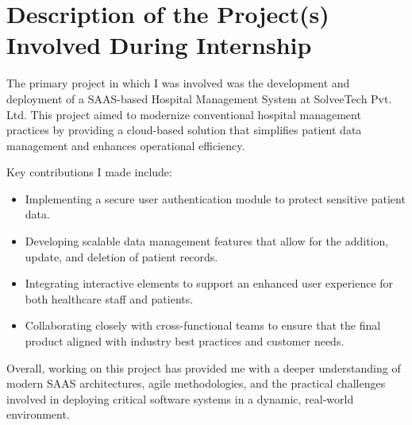 \section{Description of the Project(s) Involved During Internship}
The primary project in which I was involved was the development and deployment of a SAAS-based Hospital Management System at SolveeTech Pvt. Ltd. This project aimed to modernize conventional hospital management practices by providing a cloud-based solution that simplifies patient data management and enhances operational efficiency. 

Key contributions I made include:
\begin{itemize}
  \item Implementing a secure user authentication module to protect sensitive patient data.
  \item Developing scalable data management features that allow for the addition, update, and deletion of patient records.
  \item Integrating interactive elements to support an enhanced user experience for both healthcare staff and patients.
  \item Collaborating closely with cross-functional teams to ensure that the final product aligned with industry best practices and customer needs.
\end{itemize}

Overall, working on this project has provided me with a deeper understanding of modern SAAS architectures, agile methodologies, and the practical challenges involved in deploying critical software systems in a dynamic, real-world environment.
